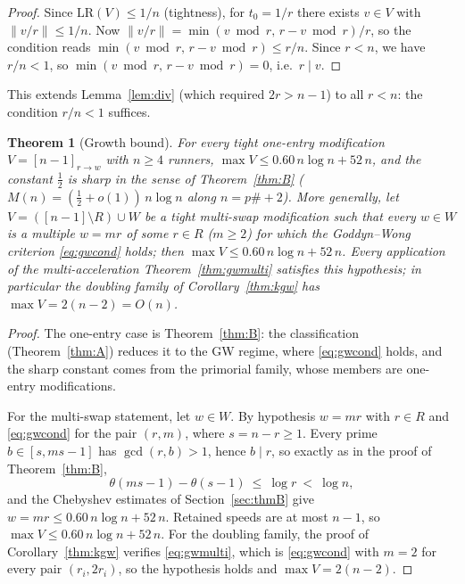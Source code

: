 \documentclass[11pt]{article}
\newtheorem{theorem}{Theorem}[section]
\theoremstyle{definition}
\newcommand{\LR}{\mathrm{LR}}
\newcommand{\norm}[1]{\left\lVert #1 \right\rVert}
\begin{document}
\begin{proof}
Since $\LR(V)\le1/n$ (tightness), for $t_0=1/r$ there exists $v\in V$ with
$\norm{v/r}\le1/n$. Now $\norm{v/r}=\min(v\bmod r,\,r-v\bmod r)/r$, so the
condition reads $\min(v\bmod r,\,r-v\bmod r)\le r/n$. Since $r<n$, we have
$r/n<1$, so $\min(v\bmod r,\,r-v\bmod r)=0$, i.e.\ $r\mid v$.
\end{proof}

This extends Lemma~\ref{lem:div} (which required $2r>n-1$) to all $r<n$:
the condition $r/n<1$ suffices.

\begin{theorem}[Growth bound]\label{thm:growth}
For every tight one-entry modification $V=[n-1]_{r\to w}$ with $n\ge4$
runners, $\max V\le0.60\,n\log n+52\,n$, and the constant $\tfrac12$ is
sharp in the sense of Theorem~\ref{thm:B}
($M(n)=(\tfrac12+o(1))\,n\log n$ along $n=p\#+2$). More generally, let
$V=([n-1]\setminus R)\cup W$
be a tight multi-swap modification such that every $w\in W$ is a
multiple $w=mr$ of some $r\in R$ ($m\ge2$) for which the Goddyn--Wong
criterion \eqref{eq:gwcond} holds; then
$\max V\le0.60\,n\log n+52\,n$. Every application of the
multi-acceleration Theorem~\ref{thm:gwmulti} satisfies this hypothesis;
in particular the doubling family of Corollary~\ref{thm:kgw} has
$\max V=2(n-2)=O(n)$.
\end{theorem}

\begin{proof}
The one-entry case is Theorem~\ref{thm:B}: the classification
(Theorem~\ref{thm:A}) reduces it to the GW regime, where
\eqref{eq:gwcond} holds, and the sharp constant comes from the
primorial family, whose members are one-entry modifications.

For the multi-swap statement, let $w\in W$. By hypothesis $w=mr$ with
$r\in R$ and \eqref{eq:gwcond} for the pair $(r,m)$, where $s=n-r\ge1$.
Every prime $b\in[s,ms-1]$ has $\gcd(r,b)>1$, hence $b\mid r$, so
exactly as in the proof of Theorem~\ref{thm:B},
\[
\theta(ms-1)-\theta(s-1)\ \le\ \log r\ <\ \log n,
\]
and the Chebyshev estimates of Section~\ref{sec:thmB} give
$w=mr\le0.60\,n\log n+52\,n$. Retained speeds are at most $n-1$, so
$\max V\le0.60\,n\log n+52\,n$. For the doubling family, the proof of
Corollary~\ref{thm:kgw} verifies \eqref{eq:gwmulti}, which is
\eqref{eq:gwcond} with $m=2$ for every pair $(r_i,2r_i)$, so the
hypothesis holds and $\max V=2(n-2)$.
\end{proof}
\end{document}
